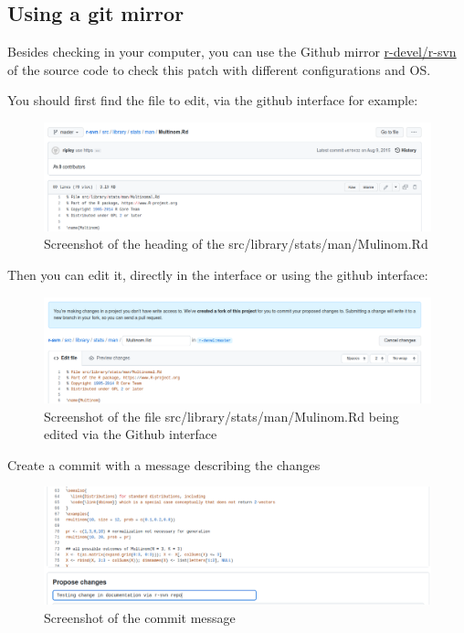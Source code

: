 \documentclass[
]{book}
\begin{document}
\subsection{Using a git mirror}\label{using-a-git-mirror}

Besides checking in your computer, you can use the Github mirror \href{https://github.com/r-devel/r-svn}{r-devel/r-svn} of the source code to check this patch with different configurations and OS.

You should first find the file to edit, via the github interface for example:

\begin{figure}
\centering
\includegraphics{img/rsvn_file_to_edit.png}
\caption{Screenshot of the heading of the src/library/stats/man/Mulinom.Rd}
\end{figure}

Then you can edit it, directly in the interface or using the github interface:

\begin{figure}
\centering
\includegraphics{img/rsvn_edit_file.png}
\caption{Screenshot of the file src/library/stats/man/Mulinom.Rd being edited via the Github interface}
\end{figure}

Create a commit with a message describing the changes

\begin{figure}
\centering
\includegraphics{img/rsvn_commit_message.png}
\caption{Screenshot of the commit message}
\end{figure}
\end{document}
